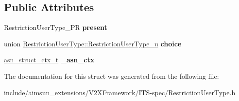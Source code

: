 \subsection*{Public Attributes}
\begin{DoxyCompactItemize}
\item 
Restriction\+User\+Type\+\_\+\+PR {\bfseries present}\hypertarget{structRestrictionUserType_aa4eab733fd05d475d8ad40d1b3bfffaf}{}\label{structRestrictionUserType_aa4eab733fd05d475d8ad40d1b3bfffaf}

\item 
union \hyperlink{unionRestrictionUserType_1_1RestrictionUserType__u}{Restriction\+User\+Type\+::\+Restriction\+User\+Type\+\_\+u} {\bfseries choice}\hypertarget{structRestrictionUserType_a3531033a096c6c4fdff61b9f5bcadc5c}{}\label{structRestrictionUserType_a3531033a096c6c4fdff61b9f5bcadc5c}

\item 
\hyperlink{structasn__struct__ctx__s}{asn\+\_\+struct\+\_\+ctx\+\_\+t} {\bfseries \+\_\+asn\+\_\+ctx}\hypertarget{structRestrictionUserType_a971e1212f6734be7d46426ceaac54d1c}{}\label{structRestrictionUserType_a971e1212f6734be7d46426ceaac54d1c}

\end{DoxyCompactItemize}


The documentation for this struct was generated from the following file\+:\begin{DoxyCompactItemize}
\item 
include/aimsun\+\_\+extensions/\+V2\+X\+Framework/\+I\+T\+S-\/spec/Restriction\+User\+Type.\+h\end{DoxyCompactItemize}
